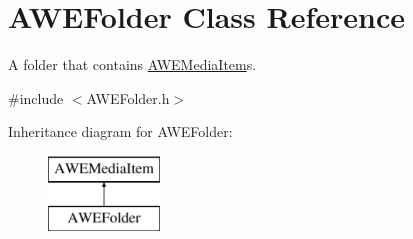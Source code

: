 \hypertarget{class_a_w_e_folder}{\section{A\-W\-E\-Folder Class Reference}
\label{class_a_w_e_folder}
}


A folder that contains {\ttfamily \hyperlink{class_a_w_e_media_item}{A\-W\-E\-Media\-Item}}s.  




{\ttfamily \#include $<$A\-W\-E\-Folder.\-h$>$}

Inheritance diagram for A\-W\-E\-Folder\-:\begin{figure}[H]
\begin{center}
\leavevmode
\includegraphics[height=2.000000cm]{class_a_w_e_folder}
\end{center}
\end{figure}
